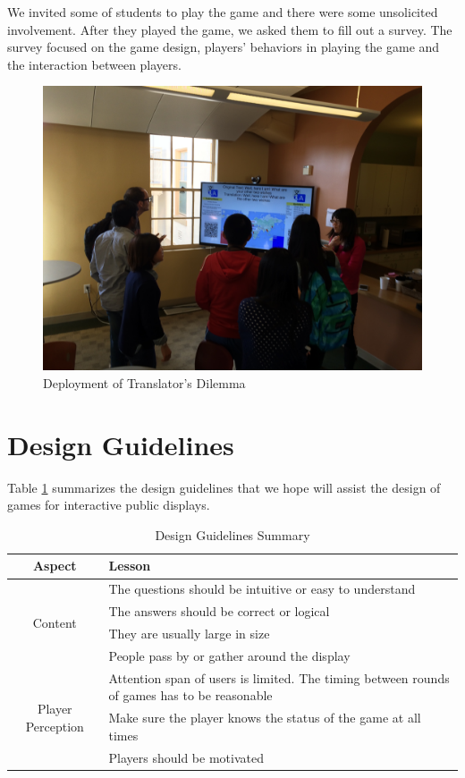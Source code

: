 \documentclass{sig-alternate}
\begin{document}
We invited some of students to play the game and there were some unsolicited involvement. After they played the game, we asked them to fill out a survey. The survey focused on the game design, players' behaviors in playing the game and the interaction between players.

\begin{figure}
	\includegraphics[width=\linewidth]{deploy.jpg}
	\caption{Deployment of Translator's Dilemma}
	\label{us:deployment}
\end{figure}

\section{Design Guidelines}
Table \ref{table:design_guidlines_summary} summarizes the design guidelines that we hope will assist the design of games for interactive public displays.

\begin{table}[ht]
	\label{table:design_guidlines_summary}
	\begin{tabular*}{1\textwidth}{c | l}
 		\hline
		Aspect & Lesson\\ \hline
  		\multirow{4}{*}{Content} & The questions should be intuitive or easy to understand\\
 			& The answers should be correct or logical\\
 			& They are usually large in size\\
 			& People pass by or gather around the display\\ \hline
		\multirow{4}{*}{Player Perception} & Attention span of users is limited. The timing between rounds of games has to be reasonable
\\
 			& Make sure the player knows the status of the game at all times\\
 			& Players should be motivated\\ \hline	
	\end{tabular*}
	\caption{Design Guidelines Summary}
\end{table}
\end{document}

